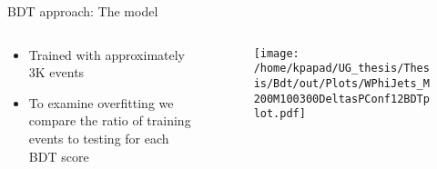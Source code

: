 \documentclass[bigger]{beamer}
\begin{document}
\begin{frame}[label={sec:orgfe04a91}]{BDT approach: The model}
\begin{columns}
\begin{column}{0.5\columnwidth}
\begin{itemize}
\item Trained with approximately 3K events
\item To examine overfitting we compare the ratio of training events to testing for each BDT score
\end{itemize}
\end{column}
\begin{column}{0.5\columnwidth}
  \begin{figure}[h!]
\centering
\texttt{[image: /home/kpapad/UG\_thesis/Thesis/Bdt/out/Plots/WPhiJets\_M200M100300DeltasPConf12BDTplot.pdf]}
\end{figure}
\end{column}
\end{columns}
\end{frame}
\end{document}
